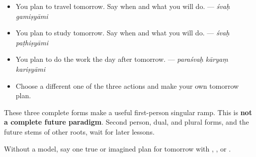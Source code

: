 \begin{itemize}
\raggedright
  \item You plan to travel tomorrow. Say when and what you will do. — \emph{śvaḥ gamiṣyāmi}
  \item You plan to study tomorrow. Say when and what you will do. — \emph{śvaḥ paṭhiṣyāmi}
  \item You plan to do the work the day after tomorrow. — \emph{paraśvaḥ kāryaṃ kariṣyāmi}
  \item Choose a different one of the three actions and make your own tomorrow plan.
\end{itemize}

\begin{grammarlens}[title={Grammar Lens: the boundary}]
These three complete forms make a useful first-person singular ramp. This is \textbf{not a complete future paradigm}. Second person, dual, and plural forms, and the future stems of other roots, wait for later lessons.
\end{grammarlens}

\begin{tcolorbox}[breakable,colback=teal!4,colframe=teal!35!black,title={Before you move on}]
Without a model, say one true or imagined plan for tomorrow with \textbf{}, \textbf{}, or \textbf{}.
\end{tcolorbox}

